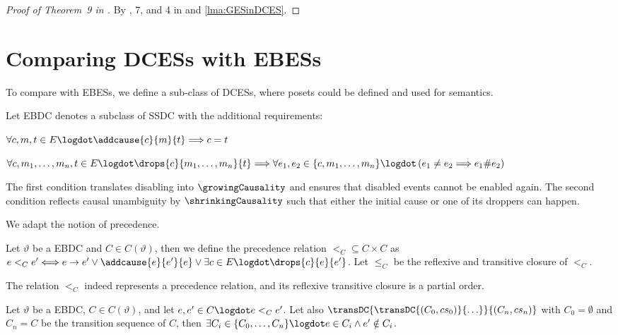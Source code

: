 \documentclass[runningheads,a4paper]{llncs}
\begin{document}
\begin{proof}[Proof of Theorem~9 in \cite{dynamicCausality15}]
By , 7, and 4 in \cite{dynamicCausality15} and \lem\ref{lma:GESinDCES}.
\end{proof}


\section{Comparing DCESs with EBESs}
\label{sec:EBESsWithDCESs}
To compare with EBESs, we define a sub-class of DCESs, where posets could be
defined and used for semantics.

\begin{definition}
\label{def:EBDC}
Let EBDC denotes a subclass of SSDC with the additional requirements:
	\begin{inparaenum}
		\item \label{eq:EBDCOnlyDisabling} $\forall c,m,t \in E \logdot
		\addcause{c}{m}{t} \Longrightarrow c = t$
		\item \label{eq:NoCausalAmbiguity} $\forall c,m_1,\ldots , m_n, t \in E
		\logdot \drops{c}{m_1,\ldots,m_n}{t} \Longrightarrow \forall e_1, e_2 \in 
		\{c,m_1,\ldots , m_n\} \logdot \left(e_1 \neq e_2 \Longrightarrow
		e_1 \# e_2 \right)$
	\end{inparaenum}
\end{definition}

The first condition translates disabling into $ \growingCausality $ and ensures that
disabled events cannot be enabled again. The second condition reflects causal
unambiguity by $ \shrinkingCausality $ such that either the initial
cause or one of its droppers can happen.

We adapt the notion of precedence.

\begin{definition}
\label{def:EBDCLposets}
Let $\vartheta$ be a EBDC and $C \in C(\vartheta)$, then we define the
precedence relation $<_C \subseteq C\times C$ as $e <_C e'
\Longleftrightarrow e \rightarrow e' \lor \addcause{e}{e'}{e} \lor \exists c
\in E\logdot \drops{c}{e}{e'}$. Let $\leq_C$ be the reflexive and
transitive closure of $<_C$.
\end{definition}

The relation $<_C$ indeed represents a precedence relation, and its
reflexive transitive closure is a partial order.

\begin{lemma}
\label{lma:EBESPrecedence}
Let $\vartheta$ be a EBDC, $C \in C(\vartheta)$, and let $e,e' \in C \logdot e
<_C e'$. Let also $ \transDC{\transDC{(C_0, cs_0)}{\ldots}}{(C_n, cs_n)}$ with $ C_0 = \emptyset $ and $ C_n = C $ be the
transition sequence of $C$,
then $\exists C_i \in \{C_0,\ldots,C_n\} \logdot e \in C_i \land e' \notin C_i$.
\end{lemma}
\end{document}
